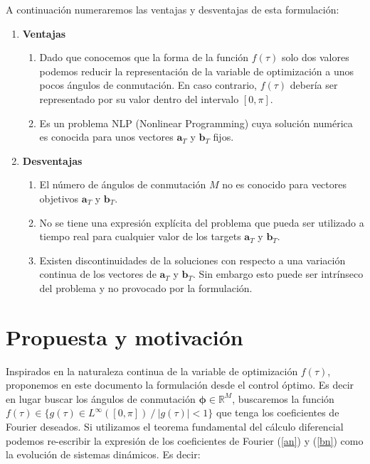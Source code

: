 A continuación numeraremos las ventajas y desventajas de esta formulación:


\begin{enumerate}
    \item \textbf{Ventajas} 
    \begin{enumerate}
        \item Dado que conocemos que la forma de la función $f(\tau)$ solo dos valores podemos reducir la representación de la variable de optimización a unos pocos ángulos de conmutación. En caso contrario, $f(\tau)$ debería ser representado por su valor dentro del intervalo $[0,\pi]$.
        \item Es un problema NLP (Nonlinear Programming) cuya solución numérica es conocida para unos vectores $\bm{a}_T$ y $\bm{b}_T$ fijos.
    \end{enumerate}
    \item \textbf{Desventajas}
    \begin{enumerate}
        \item El número de ángulos de conmutación $M$ no es conocido para vectores objetivos $\bm{a}_T$ y $\bm{b}_T$.
        \item No se tiene una expresión explícita del problema que pueda ser utilizado a tiempo real para cualquier valor de los targets $\bm{a}_T$ y $\bm{b}_T$.
        \item Existen discontinuidades de la soluciones con respecto a una variación continua de los vectores de $\bm{a}_T$ y $\bm{b}_T$. Sin embargo esto puede ser intrínseco del problema y no provocado por la formulación.
    \end{enumerate} 
\end{enumerate}


\section{Propuesta y motivación}

Inspirados en la naturaleza continua de la variable de optimización $f(\tau)$, proponemos en este documento la formulación desde el control óptimo. Es decir en lugar buscar los ángulos de conmutación $\bm{\phi} \in \mathbb{R}^M$, buscaremos la función $f(\tau) \in \{ g(\tau)  \in L^\infty([0,\pi])\ /\ |g(\tau)| < 1\} $ que tenga los coeficientes de Fourier deseados. Si utilizamos el  teorema fundamental del cálculo diferencial podemos re-escribir la expresión de los coeficientes de Fourier (\ref{an}) y (\ref{bn}) como la evolución de sistemas dinámicos. Es decir:

